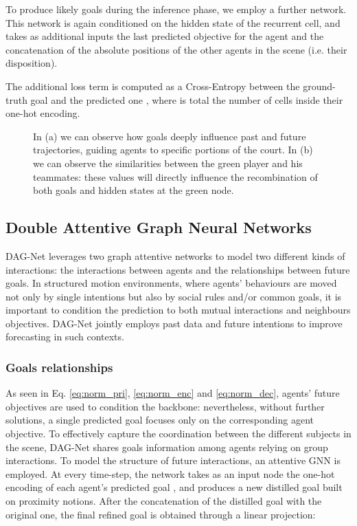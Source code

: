 \documentclass[10pt,a4paper,conference]{IEEEtran}
\begin{document}
To produce likely goals during the inference phase, we employ a further network. This network is again conditioned on the hidden state  of the recurrent cell, and takes as additional inputs the last predicted objective for the agent and the concatenation  of the absolute positions of the other agents in the scene (i.e. their disposition).





The additional loss term is computed as a Cross-Entropy between the ground-truth goal  and the predicted one , where  is total the number of cells inside their one-hot encoding.

\begin{figure}[!t]\centering
   \vspace{3pt}
    \qquad
    \qquad
    \caption{In (a) we can observe how goals deeply influence past and future trajectories, guiding agents to specific portions of the court. In (b) we can observe the similarities between the green player and his teammates: these values will directly influence the recombination of both goals and hidden states at the green node.}
    \label{fig:goals_and_similaritiesa}
\end{figure}


\subsection{Double Attentive Graph Neural Networks}
DAG-Net leverages two graph attentive networks to model two different kinds of interactions: the interactions between agents and the relationships between future goals. In structured motion environments, where agents' behaviours are moved not only by single intentions but also by social rules and/or common goals, it is important to condition the prediction to both mutual interactions and neighbours objectives. DAG-Net jointly employs past data and future intentions to improve forecasting in such contexts.


\subsubsection{Goals relationships}
As seen in Eq. \eqref{eq:norm_pri}, \eqref{eq:norm_enc} and \eqref{eq:norm_dec}, agents' future objectives are used to condition the backbone: nevertheless, without further solutions, a single predicted goal  focuses only on the corresponding agent objective. To effectively capture the coordination between the different subjects in the scene, DAG-Net shares goals information among agents relying on group interactions. To model the structure of future interactions, an attentive GNN \cite{gat} is employed. At every time-step, the network takes as an input node the one-hot encoding of each agent's predicted goal , and produces a new distilled goal  built on proximity notions. After the concatenation of the distilled goal with the original one, the final refined goal is obtained through a linear projection:
\end{document}
